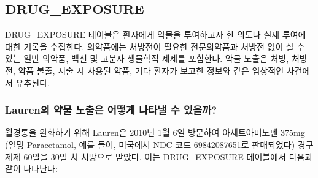 \documentclass[10.5pt]{book}
\theoremstyle{definition}
\theoremstyle{definition}
\theoremstyle{definition}
\theoremstyle{remark}
\begin{document}
\subsection{DRUG\_EXPOSURE}\label{drugExposure}

DRUG\_EXPOSURE 테이블은 환자에게 약물을 투여하고자 한 의도나 실제 투여에
대한 기록을 수집한다. 의약품에는 처방전이 필요한 전문의약품과 처방전
없이 살 수 있는 일반 의약품, 백신 및 고분자 생물학적 제제를 포함한다.
약물 노출은 처방, 처방전, 약품 불출, 시술 시 사용된 약품, 기타 환자가
보고한 정보와 같은 임상적인 사건에서 유추된다.

\subsubsection*{Lauren의 약물 노출은 어떻게 나타낼 수
있을까?}\label{lauren------}

월경통을 완화하기 위해 Lauren은 2010년 1월 6일 방문하여 아세트아미노펜
375mg (일명 Paracetamol, 예를 들어, 미국에서 NDC 코드 69842087651로
판매되었다) 경구 제제 60알을 30일 치 처방으로 받았다. 이는
DRUG\_EXPOSURE 테이블에서 다음과 같이 나타난다:
\end{document}
